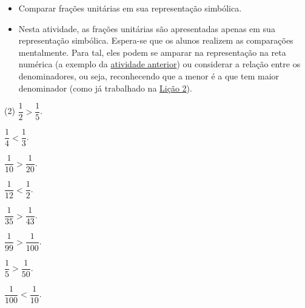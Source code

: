 \clearpage

\begin{atividade}\label{chap3-ativ14}
\objetivos
  \begin{itemize}
  \item Comparar frações unitárias em sua representação simbólica.
    \end{itemize}

\discussoes
\begin{itemize}
 \item  Nesta atividade, as frações unitárias são apresentadas apenas em sua  representação simbólica. Espera-se que os alunos realizem as comparações mentalmente. Para tal, eles podem se amparar na representação na reta numérica (a exemplo da \hyperref[chap3-ativ13]{atividade anterior}) ou considerar a relação entre os denominadores, ou seja, reconhecendo que a menor é a que tem maior denominador (como já trabalhado na \hyperref[chap2]{Lição 2}).
\end{itemize}

\solucao
\begin{tasks}(2)
\task $\dfrac{1}{2}>\dfrac{1}{5}$.

\task $\dfrac{1}{4}<\dfrac{1}{3}$.

\task $\dfrac{1}{10}>\dfrac{1}{20}$.

\task $\dfrac{1}{12}<\dfrac{1}{2}$.

\task $\dfrac{1}{35}>\dfrac{1}{43}$.

\task $\dfrac{1}{99}>\dfrac{1}{100}$.

\task $\dfrac{1}{5}>\dfrac{1}{50}$.

\task $\dfrac{1}{100}<\dfrac{1}{10}$.
\end{tasks}

\end{atividade}

